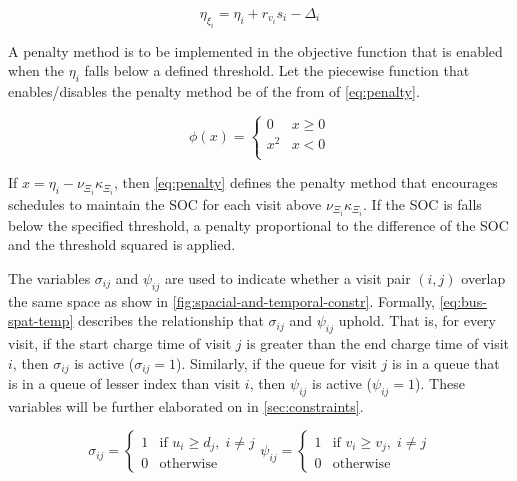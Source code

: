\documentclass[11pt,a4paper,final]{article}
\begin{document}
\begin{equation}
\label{eq:bat-chain}
  \eta_{\xi_i} = \eta_i + r_{v_i}s_i - \Delta_i
\end{equation}

A penalty method is to be implemented in the objective function that is enabled when the \(\eta_i\) falls below a defined
threshold. Let the piecewise function that enables/disables the penalty method be of the from of \ref{eq:penalty}.

\begin{equation}
\label{eq:penalty}
  \phi(x) =
  \begin{cases}
    0   & x \ge 0 \\
    x^2 & x < 0\\
  \end{cases}
\end{equation}

If \(x = \eta_i - \nu_{\Xi_i} \kappa_{\Xi_i}\), then \ref{eq:penalty} defines the penalty method that encourages schedules to maintain the SOC
for each visit above \(\nu_{\Xi_i} \kappa_{\Xi_i}\). If the SOC is falls below the specified threshold, a penalty proportional to the
difference of the SOC and the threshold squared is applied.

The variables \(\sigma_{ij}\) and \(\psi_{ij}\) are used to indicate whether a visit pair \((i, j)\) overlap the same space as show in
\ref{fig:spacial-and-temporal-constr}. Formally, \ref{eq:bus-spat-temp} describes the relationship that \(\sigma_{ij}\) and \(\psi_{ij}\)
uphold. That is, for every visit, if the start charge time of visit \(j\) is greater than the end charge time of visit
\(i\), then \(\sigma_{ij}\) is active (\(\sigma_{ij} = 1\)). Similarly, if the queue for visit \(j\) is in a queue that is in a queue of
lesser index than visit \(i\), then \(\psi_{ij}\) is active (\(\psi_{ij} = 1\)). These variables will be further elaborated on in
\ref{sec:constraints}.

\begin{subequations}
\label{eq:bus-spat-temp}
\begin{equation}
  \sigma_{ij} =
  \begin{cases}
    1 & \text{if } u_i \ge d_j, \; i \ne j\\
    0 & \text{otherwise}
  \end{cases}
\end{equation}

\begin{equation}
  \psi_{ij} =
  \begin{cases}
    1 & \text{if } v_i \ge v_j,\; i \ne j\\
    0 & \text{otherwise}
  \end{cases}
\end{equation}
\end{subequations}
\end{document}
